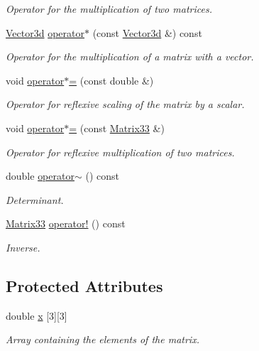 \begin{DoxyCompactItemize}
\begin{DoxyCompactList}\small\item\em Operator for the multiplication of two matrices. \end{DoxyCompactList}\item 
\hyperlink{classVector3d}{Vector3d} \hyperlink{classMatrix33_a601584a1edbaae7c6a2a2874605d6f61}{operator$\ast$} (const \hyperlink{classVector3d}{Vector3d} \&) const 
\begin{DoxyCompactList}\small\item\em Operator for the multiplication of a matrix with a vector. \end{DoxyCompactList}\item 
void \hyperlink{classMatrix33_a83162791813bef030b1ceb5df3c5cae3}{operator$\ast$=} (const double \&)
\begin{DoxyCompactList}\small\item\em Operator for reflexive scaling of the matrix by a scalar. \end{DoxyCompactList}\item 
void \hyperlink{classMatrix33_ac3937bdeb034cc83b4adcad16cd58a26}{operator$\ast$=} (const \hyperlink{classMatrix33}{Matrix33} \&)
\begin{DoxyCompactList}\small\item\em Operator for reflexive multiplication of two matrices. \end{DoxyCompactList}\item 
double \hyperlink{classMatrix33_a15b37caa6ab0d9f4a9f0d95846abd675}{operator$\sim$} () const 
\begin{DoxyCompactList}\small\item\em Determinant. \end{DoxyCompactList}\item 
\hyperlink{classMatrix33}{Matrix33} \hyperlink{classMatrix33_a1b822a20343a26b3c9bb7fd5c1247f37}{operator!} () const 
\begin{DoxyCompactList}\small\item\em Inverse. \end{DoxyCompactList}\end{DoxyCompactItemize}
\subsection*{Protected Attributes}
\begin{DoxyCompactItemize}
\item 
double \hyperlink{classMatrix33_af7f01fa466616eb7c8eda2e4d9f85cdd}{x} \mbox{[}3\mbox{]}\mbox{[}3\mbox{]}
\begin{DoxyCompactList}\small\item\em Array containing the elements of the matrix. \end{DoxyCompactList}\end{DoxyCompactItemize}


